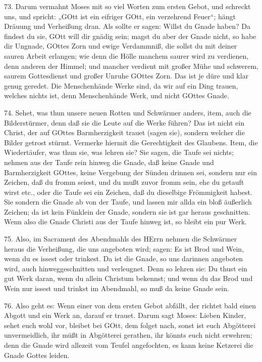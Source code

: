 73. Darum vermahnt Moses mit so viel Worten zum ersten Gebot, und schreckt uns, und spricht: „GOtt ist ein eifriger GOtt, ein verzehrend Feuer“; hängt Dräuung und Verheißung dran. Als sollte er sagen: Willst du Gnade haben? Da findest du sie, GOtt will dir gnädig sein; magst du aber der Gnade nicht, so habe dir Ungnade, GOttes Zorn und ewige Verdammniß, die sollst du mit deiner sauren Arbeit erlangen; wie denn die Hölle manchem saurer wird zu verdienen, denn anderen der Himmel; und mancher verdient mit großer Mühe und schwerem, saurem Gottesdienst und großer Unruhe GOttes Zorn. Das ist je düre und klar genug geredet. Die Menschenhände Werke sind, da wir auf ein Ding trauen, welches nichts ist, denn Menschenhände Werk, und nicht GOttes Gnade.

74. Sehet, was thun unsere neuen Rotten und Schwärmer anders, item, auch die Bilderstürmer, denn daß sie die Leute auf die Werke führen? Das ist nicht ein Christ, der auf GOttes Barmherzigkeit trauet (sagen sie), sondern welcher die Bilder getrost stürmt. Vermerke hiermit die Gerechtigkeit des Glaubens. Item, die Wiedertäufer, was thun sie, was lehren sie? Sie sagen, die Taufe sei nichts; nehmen aus der Taufe rein hinweg die Gnade, daß keine Gnade und Barmherzigkeit GOttes, keine Vergebung der Sünden drinnen sei, sondern nur ein Zeichen, daß du fromm seiest, und du mußt zuvor fromm sein, ehe du getauft wirst etc., oder die Taufe sei ein Zeichen, daß du dieselbige Frömmigkeit habest. Sie sondern die Gnade ab von der Taufe, und lassen mir allda ein bloß äußerlich Zeichen; da ist kein Fünklein der Gnade, sondern sie ist gar heraus geschnitten. Wenn also die Gnade Christi aus der Taufe hinweg ist, so bleibt ein pur Werk.

75. Also, im Sacrament des Abendmahls des HErrn nehmen die Schwärmer heraus die Verheißung, die uns angeboten wird; sagen: Es ist Brod und Wein, wenn du es issest oder trinkest. Da ist die Gnade, so uns darinnen angeboten wird, auch hinweggeschnitten und verleugnet. Denn so lehren sie: Du thust ein gut Werk daran, wenn du allein Christum bekennst; und wenn du das Brod und Wein nur issest und trinkst im Abendmahl, so muß da keine Gnade sein.

76. Also geht es: Wenn einer von dem ersten Gebot abfällt, der richtet bald einen Abgott und ein Werk an, darauf er trauet. Darum sagt Moses: Lieben Kinder, sehet euch wohl vor, bleibet bei GOtt, dem folget nach, sonst ist euch Abgötterei unvermeidlich, ihr müßt in Abgötterei gerathen, ihr könnts euch nicht erwehren; denn die Gnade wird allezeit vom Teufel angefochten, es kann keine Ketzerei die Gnade Gottes leiden.

